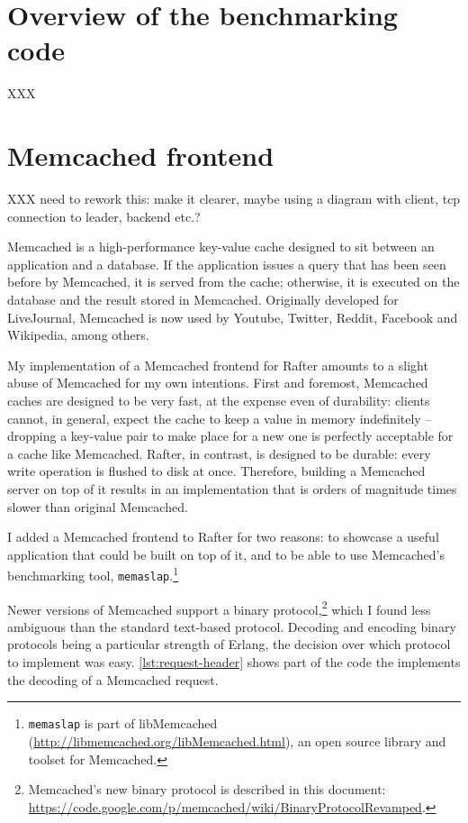 \documentclass[draft,11pt,chapterprefix=true,toc=bibliography,numbers=noendperiod,
               footnotes=multiple,twoside]{scrreprt}
\begin{document}
\section{Overview of the benchmarking code}

XXX

\section{Memcached frontend}

XXX need to rework this: make it clearer, maybe using a diagram with client, tcp connection to leader, backend etc.?

Memcached is a high-performance key-value cache designed to sit between an application and a database. If the application issues a query that has been seen before by Memcached, it is served from the cache; otherwise, it is executed on the database and the result stored in Memcached. Originally developed for LiveJournal, Memcached is now used by Youtube, Twitter, Reddit, Facebook and Wikipedia, among others.

My implementation of a Memcached frontend for Rafter amounts to a slight abuse of Memcached for my own intentions. First and foremost, Memcached caches are designed to be very fast, at the expense even of durability: clients cannot, in general, expect the cache to keep a value in memory indefinitely -- dropping a key-value pair to make place for a new one is perfectly acceptable for a cache like Memcached. Rafter, in contrast, is designed to be durable: every write operation is flushed to disk at once. Therefore, building a Memcached server on top of it results in an implementation that is orders of magnitude times slower than original Memcached.

I added a Memcached frontend to Rafter for two reasons: to showcase a useful application that could be built on top of it, and to be able to use Memcached's benchmarking tool, \texttt{memaslap}.\footnote{\texttt{memaslap} is part of libMemcached (\url{http://libmemcached.org/libMemcached.html}), an open source library and toolset for Memcached.}

Newer versions of Memcached support a binary protocol,\footnote{Memcached's new binary protocol is described in this document: \url{https://code.google.com/p/memcached/wiki/BinaryProtocolRevamped}.} which I found less ambiguous than the standard text-based protocol. Decoding and encoding binary protocols being a particular strength of Erlang, the decision over which protocol to implement was easy. \autoref{lst:request-header} shows part of the code the implements the decoding of a Memcached request.
\end{document}
